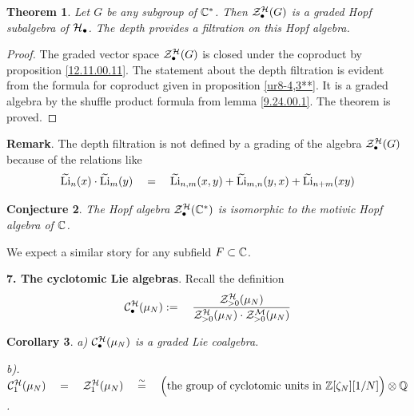 \documentclass[10pt]{article}
\newtheorem{theorem}{Theorem}[section]
\newtheorem{corollary}[theorem]{Corollary}
\newtheorem{conjecture}[theorem]{Conjecture}
\begin{document}
\begin{theorem} \label{9.30.00.3}
Let $G$ be any subgroup of  ${\mathbb C}^*$. Then 
${\cal Z}^{\cal H}_{\bullet}(G)$ is a graded 
Hopf subalgebra of ${\cal H}_{\bullet}$. 
The depth provides a filtration on this Hopf algebra.
\end{theorem}

\begin{proof} 
The graded vector space ${\cal Z}^{\cal H}_{\bullet}(G)$ is closed under the coproduct by  
proposition \ref{12.11.00.11}. The statement about the depth filtration is evident from the formula for coproduct given in proposition \ref{ur8-4,3**}. 
It is a graded algebra  by the shuffle product formula from lemma \ref{9.24.00.1}. 
The theorem  is proved. 


\end{proof}

{\bf Remark}. The depth filtration is not defined by a grading of the algebra
${\cal Z}^{\cal H}_{\bullet}(G)$ because of the  
relations like 
$$
\widetilde {\rm Li}_{n}(x) \cdot \widetilde {\rm Li}_{m}(y) \quad = \quad 
\widetilde {\rm Li}_{n,m}(x,y) + 
\widetilde {\rm Li}_{m,n}(y,x) + \widetilde {\rm Li}_{n+m}(xy)
$$


\begin{conjecture} The Hopf algebra ${\cal Z}^{\cal H}_{\bullet}({\mathbb C}^*)$ is isomorphic to the 
motivic Hopf algebra of ${\mathbb C}$. 
\end{conjecture}
We expect a similar story for any subfield $F \subset {\mathbb C}$. 


{\bf 7. The cyclotomic Lie algebras}. Recall the definition
$$%
 {\cal C}^{{\cal H}}_{\bullet}(\mu_N):= \quad 
\frac{{\cal Z}^{{\cal H}}_{>0}(\mu_N)}{
{\cal Z}^{{\cal H}}_{>0}(\mu_N) \cdot {\cal Z}^{{\cal M}}_{>0}(\mu_N)}
$$%
 \begin{corollary} \label{ur8-11} 
a) ${\cal C}^{{\cal H}}_{\bullet}(\mu_N)$ is a graded Lie coalgebra. 

b). 
${\cal C}^{{\cal H}}_{1}(\mu_N) \quad = \quad {\cal Z}^{{\cal H}}_{1}(\mu_N) \quad \stackrel{\sim}{=} \quad
\Bigl(\mbox{the group of cyclotomic units in ${\mathbb Z}[\zeta_N][1/N]\Bigr) \otimes {\mathbb Q}$}$.
\end{corollary} 
\end{document}
